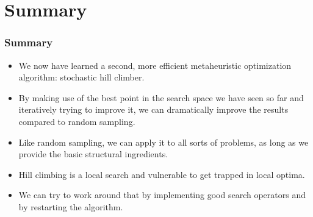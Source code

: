 \documentclass[mathserif]{beamer}%
\begin{document}
\section{Summary}%
%
\begin{frame}%
\frametitle{Summary}%
\begin{itemize}%
\item We now have learned a second, more efficient metaheuristic optimization algorithm: stochastic hill climber.%
\item<2-> By making use of the best point in the search space we have seen so far and iteratively trying to improve it, we can dramatically improve the results compared to random sampling.%
\item<3-> Like random sampling, we can apply it to all sorts of problems, as long as we provide the basic structural ingredients.%
\item<4-> Hill climbing is a local search and vulnerable to get trapped in local optima.%
\item<5-> We can try to work around that by implementing good search operators and by restarting the algorithm.%
\end{itemize}%
\end{frame}%
%
\endPresentation%
\end{document}

